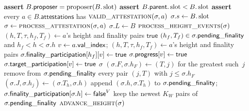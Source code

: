 \label{alg:chain-full}
\nopagebreak
{\footnotesize
\begin{algorithmic}[1]
  \State \textbf{assert} $B.\mathsf{proposer}=\operatorname{proposer}(B.\operatorname{slot})$
  \State \textbf{assert} $B.\mathsf{parent}.\operatorname{slot}<B.\operatorname{slot}$
  \State \textbf{assert} every $a\in B.\mathsf{attestations}$ has
    $\Call{valid\_attestation}{\sigma,a}$
  \State $\sigma.s\gets B.\operatorname{slot}$
    \State $\sigma\gets\Call{process\_attestation}{\sigma,a}$
  \EndFor
  \State $\sigma.L\gets B$
  \State \Return $\Call{process\_height\_events}{\sigma}$
\EndFunction
\vspace{1pt}
  \State $(h,T,\tau,h_f,T_f)\gets a$'s height and finality pairs
    \State \Return $\mathsf{true}$
  \EndIf
  \State \Return $(h_f,T_f)\in\sigma.\mathsf{pending\_finality}$ and
    $h_f<h<\sigma.h$
\EndFunction
\vspace{1pt}
  \State $v\gets a.\mathsf{val\_index}$;\quad
    $(h,T,\tau,h_f,T_f)\gets a$'s height and finality pairs
    \State $\sigma.\mathsf{finality\_participation}[h_f][v]\gets\mathsf{true}$
  \EndIf
    \State $\sigma.\mathsf{progress}[v]\gets\mathsf{true}$
      \State $\sigma.\mathsf{target\_participation}[v]\gets\mathsf{true}$
    \EndIf
  \EndIf
  \State \Return $\sigma$
\EndFunction
\vspace{1pt}
    \State $(\sigma.F,\sigma.h_F)\gets(T,j)$ for the greatest such~$j$
  \EndIf
  \State remove from $\sigma.\mathsf{pending\_finality}$ every pair $(j,T)$ with
    $j\leq\sigma.h_F$
    \State $(\sigma.J,\sigma.h_j)\gets(\sigma.T_h,\sigma.h)$
    \State append $(\sigma.h,\sigma.T_h)$ to $\sigma.\mathsf{pending\_finality}$;
      $\sigma.\mathsf{finality\_participation}[\sigma.h]\gets\mathsf{false}^{V}$
    \State keep the newest $K_W$ pairs of $\sigma.\mathsf{pending\_finality}$
    \State \Return $\Call{advance\_height}{\sigma}$
  \EndIf
\end{algorithmic}}
